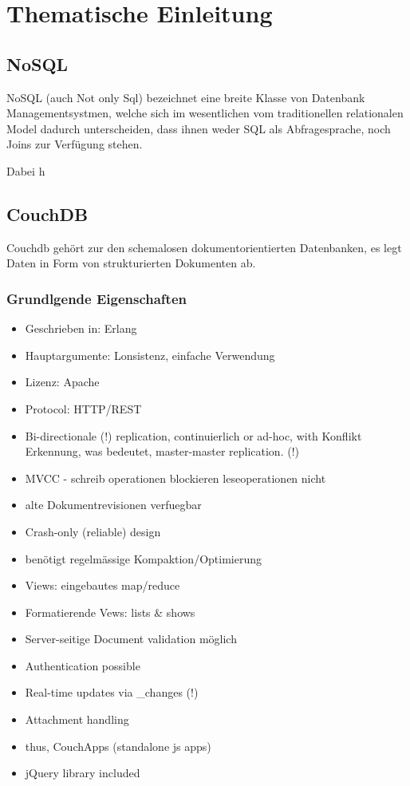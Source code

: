 \chapter{Thematische Einleitung}

\section{NoSQL}


NoSQL (auch Not only Sql) bezeichnet eine breite Klasse
von Datenbank Managementsystmen, welche sich im wesentlichen
vom traditionellen relationalen Model dadurch unterscheiden,
dass ihnen weder SQL als Abfragesprache, noch Joins zur Verfügung stehen.
~ \cite{wikipedia:nosql}


Dabei h

\section{CouchDB}

Couchdb gehört zur den schemalosen dokumentorientierten Datenbanken,
es legt Daten in Form von strukturierten Dokumenten ab.

\subsection{Grundlgende Eigenschaften}


\begin{itemize}
\item Geschrieben in: Erlang
\item Hauptargumente: Lonsistenz, einfache Verwendung
\item Lizenz: Apache
\item Protocol: HTTP/REST
\item Bi-directionale (!) replication,
    continuierlich or ad-hoc,
    with Konflikt Erkennung,
    was bedeutet, master-master replication. (!)

\item MVCC - schreib operationen blockieren leseoperationen nicht
\item alte Dokumentrevisionen verfuegbar
\item Crash-only (reliable) design
\item benötigt regelmässige Kompaktion/Optimierung
\item Views: eingebautes map/reduce
\item Formatierende Vews: lists \& shows
\item Server-seitige Document validation möglich
\item Authentication possible
\item Real-time updates via \_changes (!)
\item Attachment handling
\item thus, CouchApps (standalone js apps)
\item jQuery library included 
\end{itemize}
~ \cite{web:db-compare}

